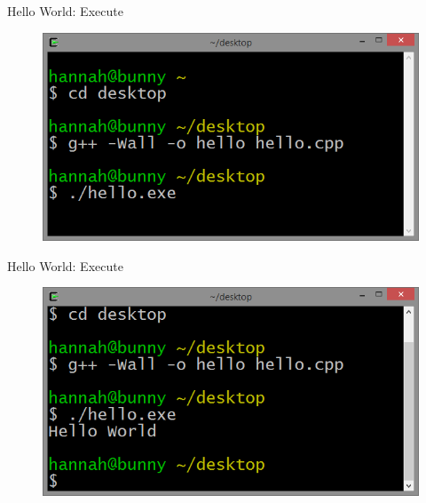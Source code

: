 \documentclass[xcolor={dvipsnames}]{beamer}
\begin{document}
\begin{frame}{Hello World: Execute}
	\begin{figure}
			\includegraphics[width=1\textwidth]{execute}
	\end{figure}
\end{frame}

\begin{frame}{Hello World: Execute}
	\begin{figure}
			\includegraphics[width=1\textwidth]{executed}
	\end{figure}
\end{frame}
\end{document}
